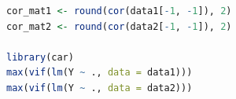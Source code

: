 \documentclass[11pt]{article}
\begin{document}
\setcounter{MaxMatrixCols}{32}
\begin{landscape}


\restoregeometry
\end{landscape}


\begin{file}[project.r]
\begin{lstlisting}[language = R]
cor_mat1 <- round(cor(data1[-1, -1]), 2)
cor_mat2 <- round(cor(data2[-1, -1]), 2)

library(car)
max(vif(lm(Y ~ ., data = data1)))
max(vif(lm(Y ~ ., data = data2)))
\end{lstlisting}
\end{file}



\end{document}
